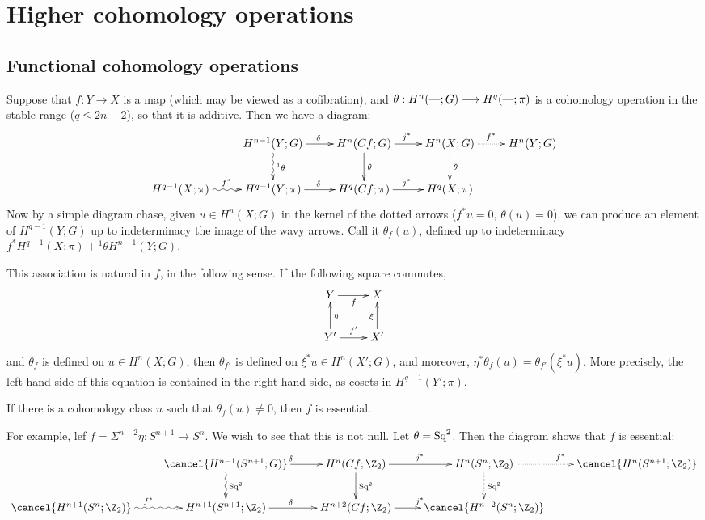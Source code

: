 \documentclass[11pt]{article}
\begin{document}
\section{Higher cohomology operations}
\subsection{Functional cohomology operations}
Suppose that $f:Y\to X$ is a map (which may be viewed as a cofibration), and 
$\theta:H^n(\textup{---};G)\longrightarrow H^q(\textup{---};\pi)$ is a cohomology operation in the stable
range ($q\leq2n-2$), so that it is additive.
Then we have a diagram:
\[\xymatrix{
&H^{n-1}(Y;G)\ar[r]^\delta\ar@{~>}[d]^{^1\theta}&
H^n(Cf;G)\ar[r]^{j^*}\ar[d]^\theta&
H^n(X;G)\ar@{.>}[r]^{f^*}\ar@{.>}[d]^\theta&
H^n(Y;G)\\
H^{q-1}(X;\pi)\ar@{~>}[r]^{f^*}&
H^{q-1}(Y;\pi)\ar[r]^\delta&
H^q(Cf;\pi)\ar[r]^{j^*}&
H^q(X;\pi)
}\]
Now by a simple diagram chase, given $u\in H^n(X;G)$ in the kernel of the dotted
arrows ($f^*u=0,\,\theta(u)=0$), we can produce an element of $H^{q-1}(Y;G)$ up
to indeterminacy the image of the wavy arrows. Call it $\theta_f(u)$, defined up
to indeterminacy $f^*H^{q-1}(X;\pi)+{^1\theta}H^{n-1}(Y;G)$.

This association is natural in $f$, in the following sense. If the following
square commutes,
\[\xymatrix{
Y\ar[r]_f& X\\
Y'\ar[r]^{f'}\ar[u]_\eta&X'\ar[u]^\xi
}\]
and $\theta_f$ is defined on $u\in H^n(X;G)$, then $\theta_{f'}$ is defined on
$\xi^*u\in H^n(X';G)$, and moreover, $\eta^*\theta_f(u)=\theta_{f'}(\xi^*u)$.
More precisely, the left hand side of this equation is contained in the right
hand side, as cosets in $H^{q-1}(Y';\pi)$.
\begin{prop*}
If there is a cohomology class $u$ such that $\theta_f(u)\neq0$, then $f$ is
essential.
\end{prop*}
For example, lef $f=\Sigma^{n-2}\eta:S^{n+1}\to S^n$. We wish to see that this
is not null. Let $\theta=\textup{Sq}^2$. Then the diagram shows that $f$ is essential:
\[\xymatrix{
&\cancel{H^{n-1}(S^{n+1};G)}\ar[r]^\delta\ar@{~>}[d]^{\Squ^2}&
H^n(Cf;\Z_2)\ar[r]^{j^*}\ar[d]^{\Squ^2}&
H^n(S^n;\Z_2)\ar@{.>}[r]^{f^*}\ar@{.>}[d]^{\Squ^2}&
\cancel{H^n(S^{n+1};\Z_2)}\\
\cancel{H^{n+1}(S^n;\Z_2)}\ar@{~>}[r]^{f^*}&
H^{n+1}(S^{n+1};\Z_2)\ar[r]^\delta&
H^{n+2}(Cf;\Z_2)\ar[r]^{j^*}&
\cancel{H^{n+2}(S^n;\Z_2)}
}\]
\end{document}
